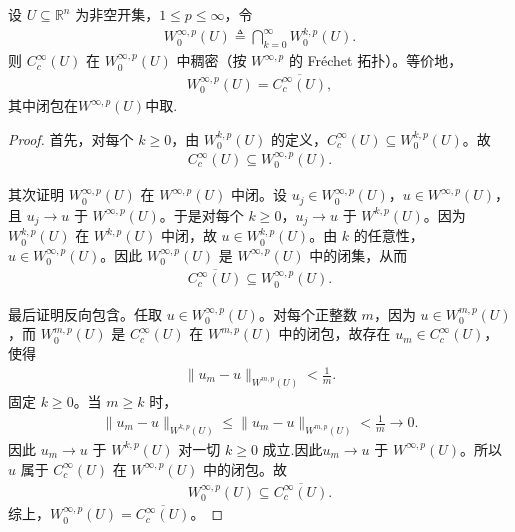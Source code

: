 \documentclass[../../main.tex]{subfiles}
\begin{document}
\begin{proposition}\label{proposition:ch05-Winfty0稠密}
设 $U\subseteq\mathbb{R}^n$ 为非空开集，$1\leqslant p\leqslant\infty$，令
\begin{align*}
W^{\infty,p}_0(U)\triangleq\bigcap_{k=0}^{\infty}W^{k,p}_0(U).
\end{align*}
则 $C_c^\infty(U)$ 在 $W^{\infty,p}_0(U)$ 中稠密（按 $W^{\infty,p}$ 的 Fréchet 拓扑）。等价地，
\begin{align*}
W^{\infty,p}_0(U)=\overline{C_c^\infty(U)},
\end{align*}
其中闭包在$W^{\infty,p}(U)$中取.
\end{proposition}
\begin{proof}

首先，对每个 $k\geqslant0$，由 $W^{k,p}_0(U)$ 的定义，$C_c^\infty(U)\subseteq W^{k,p}_0(U)$。故
\begin{align*}
C_c^\infty(U)\subseteq W^{\infty,p}_0(U).
\end{align*}

其次证明 $W^{\infty,p}_0(U)$ 在 $W^{\infty,p}(U)$ 中闭。设 $u_j\in W^{\infty,p}_0(U)$，$u\in W^{\infty,p}(U)$，且 $u_j\to u$ 于 $W^{\infty,p}(U)$。于是对每个 $k\geqslant0$，$u_j\to u$ 于 $W^{k,p}(U)$。因为 $W^{k,p}_0(U)$ 在 $W^{k,p}(U)$ 中闭，故 $u\in W^{k,p}_0(U)$。由 $k$ 的任意性，$u\in W^{\infty,p}_0(U)$。因此 $W^{\infty,p}_0(U)$ 是 $W^{\infty,p}(U)$ 中的闭集，从而
\begin{align*}
\overline{C_c^\infty(U)}\subseteq W^{\infty,p}_0(U).
\end{align*}

最后证明反向包含。任取 $u\in W^{\infty,p}_0(U)$。对每个正整数 $m$，因为 $u\in W^{m,p}_0(U)$，而 $W^{m,p}_0(U)$ 是 $C_c^\infty(U)$ 在 $W^{m,p}(U)$ 中的闭包，故存在 $u_m\in C_c^\infty(U)$，使得
\begin{align*}
\|u_m-u\|_{W^{m,p}(U)}<\frac1m.
\end{align*}
固定 $k\geqslant0$。当 $m\geqslant k$ 时，
\begin{align*}
\|u_m-u\|_{W^{k,p}(U)}
\leqslant\|u_m-u\|_{W^{m,p}(U)}
<\frac1m\longrightarrow0.
\end{align*}
因此 $u_m\to u$ 于 $W^{k,p}(U)$ 对一切 $k\geqslant0$ 成立.因此$u_m\to u$ 于 $W^{\infty,p}(U)$。所以 $u$ 属于 $C_c^\infty(U)$ 在 $W^{\infty,p}(U)$ 中的闭包。故
\begin{align*}
W^{\infty,p}_0(U)\subseteq\overline{C_c^\infty(U)}.
\end{align*}
综上，$W^{\infty,p}_0(U)=\overline{C_c^\infty(U)}$。
\end{proof}
\end{document}
